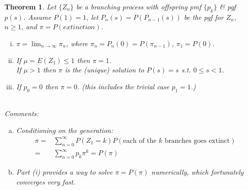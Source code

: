 \documentclass[12pt]{article}
\theoremstyle{definition}
\theoremstyle{plain}
\newtheorem{mythm}{Theorem}[section]
\begin{document}
\begin{mythm}
Let $\{Z_n\}$ be a branching process with offspring pmf $\{p_k\}$ \& pgf $p(s)$. Assume $P(1)=1$, let $P_n(s) = P(P_{n-1}(s))$ be the pgf for $Z_n$, $n \geq 1$, and $\pi = P(extinction)$.
\begin{enumerate}[(i)]
\item $\pi = \lim_{n \rightarrow \infty} \pi_n$, where $\pi_n = P_n(0) = P(\pi_{n-1})$, $\pi_1 = P(0)$.
\item If $\mu = E(Z_1) \leq 1$ then $\pi = 1$. \\
	If $\mu > 1$ then $\pi$ is the (unique) solution to $P(s) = s$ s.t. $0 \leq s < 1$.
\item If $p_0 = 0$ then $\pi = 0$. (this includes the trivial case $p_1 =1$.)
\end{enumerate}
$\mbox{}$ \\
Comments:
\begin{enumerate}[(a)]
\item Conditioning on the  generation:
\begin{displaymath}
\begin{aligned}
\pi =&\sum_{n=0}^\infty P(Z_1 = k) P(\mbox{each of the $k$ branches goes extinct}) \\
=& \sum_{n=0}^\infty p_k \pi^k = P(\pi)
\end{aligned}
\end{displaymath}
\item Part (i) provides a way to solve $\pi = P(\pi)$ numerically, which fortunately converges very fast.
\end{enumerate}
\end{mythm}
\end{document}

